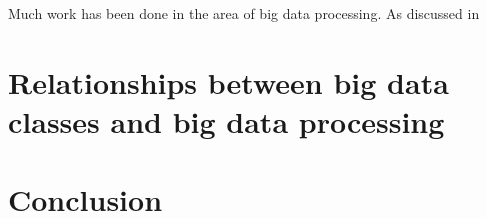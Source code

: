 \documentclass[a4paper,11pt]{article}
\begin{document}
Much work has been done in the area of big data processing. As discussed in



\section{Relationships between big data classes and big data processing} %
\label{sec:relationships_between_big_data_classes_and_big_data_processing}



\section{Conclusion} %
\label{sec:conclusion}


\newpage



\end{document}
